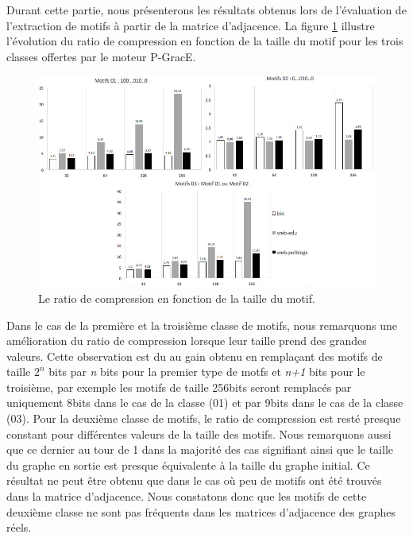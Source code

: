 	Durant cette partie, nous présenterons les résultats obtenus lors de l'évaluation de l'extraction de motifs à partir de la matrice d'adjacence. La figure \ref{fig:test-m} illustre l'évolution du ratio de compression en fonction de la taille du motif pour les trois classes offertes par le moteur P-GracE.
		\begin{figure}[H]
		\begin{center}
		
			\includegraphics[scale=0.55]{ressources/image/m12.jpg}
			
			
			
			\caption{Le ratio de compression en fonction de la taille du motif.}
			\label{fig:test-m}
		\end{center}
	\end{figure}
	
	Dans le cas de la première et la troisième classe de motifs, nous remarquons une amélioration du ratio de compression lorsque leur taille prend des grandes valeurs. Cette observation est du au gain obtenu en remplaçant des motifs de taille $2^n$ bits par \textit{n} bits pour la premier type de motfs et \textit{n+1} bits pour le troisième, par exemple les motifs de taille 256bits seront remplacés par uniquement 8bits dans le cas de la classe (01) et par 9bits dans le cas de la classe (03). Pour la deuxième classe de motifs, le ratio de compression est resté presque constant pour différentes valeurs de la taille des motifs. Nous remarquons aussi que ce dernier au tour de 1 dans la majorité des cas signifiant ainsi que le taille du graphe en sortie est presque équivalente à la taille du graphe initial. Ce résultat ne peut être obtenu que dans le cas où peu de motifs ont été trouvés dans la matrice d'adjacence. Nous constatons donc que les motifs de cette deuxième classe ne sont pas fréquents dans les matrices d'adjacence des graphes réels. 
	
